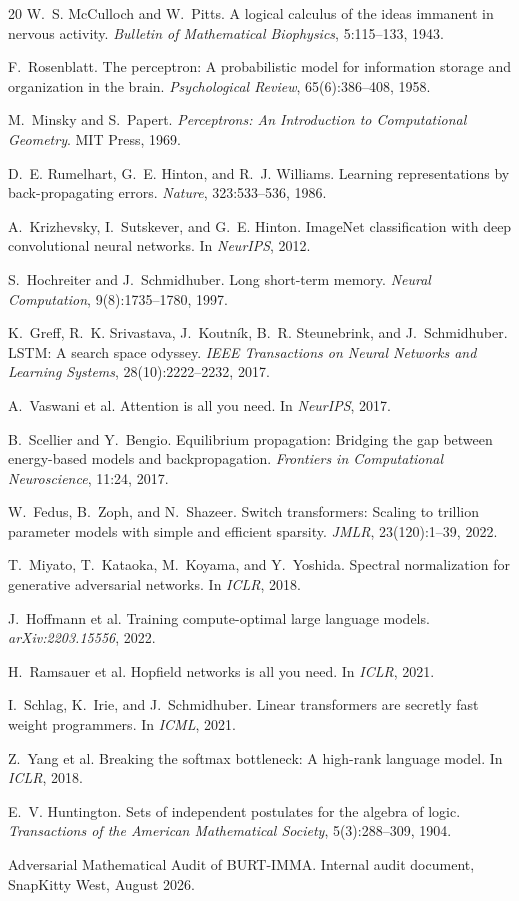\documentclass[11pt,letterpaper]{article}
\begin{document}
\begin{thebibliography}{20}
W.~S. McCulloch and W.~Pitts.
A logical calculus of the ideas immanent in nervous activity.
\emph{Bulletin of Mathematical Biophysics}, 5:115--133, 1943.

F.~Rosenblatt.
The perceptron: A probabilistic model for information storage and organization in the brain.
\emph{Psychological Review}, 65(6):386--408, 1958.

M.~Minsky and S.~Papert.
\emph{Perceptrons: An Introduction to Computational Geometry}.
MIT Press, 1969.

D.~E. Rumelhart, G.~E. Hinton, and R.~J. Williams.
Learning representations by back-propagating errors.
\emph{Nature}, 323:533--536, 1986.

A.~Krizhevsky, I.~Sutskever, and G.~E. Hinton.
ImageNet classification with deep convolutional neural networks.
In \emph{NeurIPS}, 2012.

S.~Hochreiter and J.~Schmidhuber.
Long short-term memory.
\emph{Neural Computation}, 9(8):1735--1780, 1997.

K.~Greff, R.~K. Srivastava, J.~Koutník, B.~R. Steunebrink, and J.~Schmidhuber.
LSTM: A search space odyssey.
\emph{IEEE Transactions on Neural Networks and Learning Systems},
28(10):2222--2232, 2017.

A.~Vaswani et al.
Attention is all you need.
In \emph{NeurIPS}, 2017.

B.~Scellier and Y.~Bengio.
Equilibrium propagation: Bridging the gap between energy-based models and backpropagation.
\emph{Frontiers in Computational Neuroscience}, 11:24, 2017.

W.~Fedus, B.~Zoph, and N.~Shazeer.
Switch transformers: Scaling to trillion parameter models with simple and
efficient sparsity.
\emph{JMLR}, 23(120):1--39, 2022.

T.~Miyato, T.~Kataoka, M.~Koyama, and Y.~Yoshida.
Spectral normalization for generative adversarial networks.
In \emph{ICLR}, 2018.

J.~Hoffmann et al.
Training compute-optimal large language models.
\emph{arXiv:2203.15556}, 2022.

H.~Ramsauer et al.
Hopfield networks is all you need.
In \emph{ICLR}, 2021.

I.~Schlag, K.~Irie, and J.~Schmidhuber.
Linear transformers are secretly fast weight programmers.
In \emph{ICML}, 2021.

Z.~Yang et al.
Breaking the softmax bottleneck: A high-rank language model.
In \emph{ICLR}, 2018.

E.~V. Huntington.
Sets of independent postulates for the algebra of logic.
\emph{Transactions of the American Mathematical Society},
5(3):288--309, 1904.

Adversarial Mathematical Audit of BURT-IMMA.
Internal audit document, SnapKitty West, August 2026.
\end{thebibliography}
\end{document}
